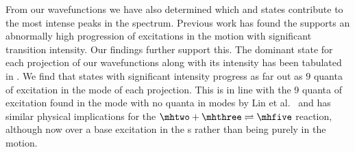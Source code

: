 %
%

From our wavefunctions we have also determined which \hplus{} and \htwos{} states contribute to the most intense peaks in the spectrum. Previous work has found the \hfive{} supports an abnormally high progression of excitations in the \hplus{} motion with significant transition intensity. Our findings further support this. The dominant \hplus{} state for each projection of our wavefunctions along with its intensity has been tabulated in . We find that states with significant intensity progress as far out as \squigg$9$ quanta of excitation in the \hplus{} mode of each projection. This is in line with the \squigg$9$ quanta of excitation found in the \hplus{} mode with no quanta in \htwo{} modes by Lin et al.~\cite{Lin2012} and has similar physical implications for the $\mhtwo + \mhthree \rightleftharpoons \mhfive$ reaction, although now over a base excitation in the \htwo{}s rather than being purely in the \hplus{} motion.
%
